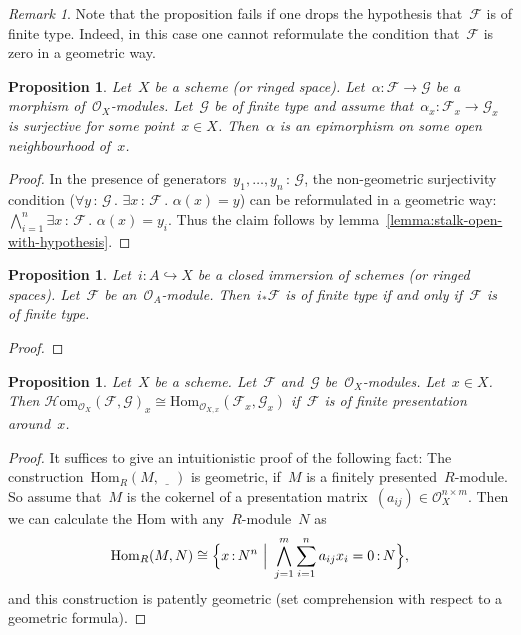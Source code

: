 \documentclass[10pt]{amsart}
\theoremstyle{definition}
\theoremstyle{plain}
\newtheorem{prop}[defn]{Proposition}
\theoremstyle{remark}
\newtheorem{rem}[defn]{Remark}
\newcommand{\F}{\mathcal{F}}
\newcommand{\G}{\mathcal{G}}
\renewcommand{\O}{\mathcal{O}}
\newcommand{\Hom}{\mathrm{Hom}}
\newcommand{\HOM}{\mathcal{H}\mathrm{om}}
\newcommand{\placeholder}{\underline{\quad}}
\newcommand{\?}{\,{:}\,}
\renewcommand{\_}{\mathpunct{.}\,}
\begin{document}
\begin{rem}Note that the proposition fails if one drops the hypothesis
that~$\F$ is of finite type. Indeed, in this case one cannot reformulate the
condition that~$\F$ is zero in a geometric way.\end{rem}

\begin{prop}Let~$X$ be a scheme (or ringed space). Let~$\alpha : \F \to \G$ be
a morphism of~$\O_X$-modules. Let~$\G$ be of finite type and assume
that~$\alpha_x : \F_x \to \G_x$ is surjective for some point~$x \in X$.
Then~$\alpha$ is an epimorphism on some open neighbourhood of~$x$.\end{prop}
\begin{proof}In the presence of generators~$y_1,\ldots,y_n\?\G$, the
non-geometric surjectivity condition ($\forall y\?\G\_ \exists x\?\F\_
\alpha(x) = y$) can be reformulated in a geometric way: $\bigwedge_{i=1}^n
\exists x\?\F\_ \alpha(x) = y_i$. Thus the claim follows by
lemma~\ref{lemma:stalk-open-with-hypothesis}.\end{proof}

\begin{prop}Let~$i : A \hookrightarrow X$ be a closed immersion of schemes (or
ringed spaces). Let~$\F$ be an~$\O_A$-module. Then~$i_*\F$ is of finite type if
and only if~$\F$ is of finite type.\end{prop}
\begin{proof}
\end{proof}

\begin{prop}Let~$X$ be a scheme. Let~$\F$ and~$\G$ be~$\O_X$-modules. Let~$x
\in X$. Then $\HOM_{\O_X}(\F,\G)_x \cong \Hom_{\O_{X,x}}(\F_x,\G_x)$ if~$\F$ is
of finite presentation around~$x$.\end{prop}
\begin{proof}It suffices to give an intuitionistic proof of the following fact:
The construction~$\Hom_R(M,\placeholder)$ is geometric, if~$M$ is a finitely
presented~$R$-module. So assume that~$M$ is the cokernel of a presentation
matrix~$(a_{ij}) \in \O_X^{n \times m}$. Then we can calculate the Hom with
any~$R$-module~$N$ as
\[ \Hom_R(M,N) \cong \Bigl\{ x \? N^n \ \Big|\ \bigwedge_{j=1}^m \sum_{i=1}^n a_{ij}
x_i = 0 \? N \Bigr\}, \]
and this construction is patently geometric (set comprehension with respect to
a geometric formula).
\end{proof}
\end{document}
